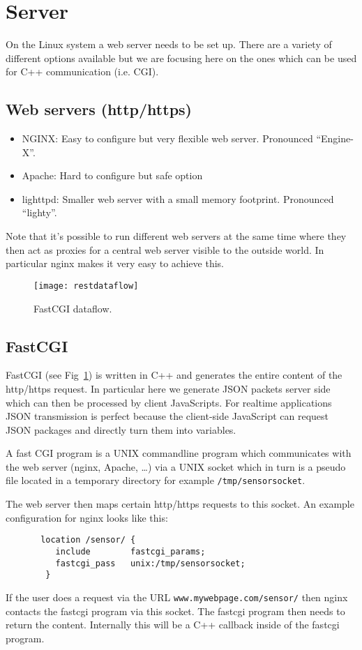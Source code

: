 \documentclass[12pt]{report}
\begin{document}
\section{Server}
On the Linux system a web server needs to be set up. There are
a variety of different options available but we are focusing here
on the ones which can be used for C++ communication (i.e. CGI).

\subsection{Web servers (http/https)}

\begin{itemize}
  \item NGINX: Easy to configure but very flexible web server. Pronounced ``Engine-X''.
  \item Apache: Hard to configure but safe option
  \item lighttpd: Smaller web server with a small memory footprint. Pronounced ``lighty''.
\end{itemize}
Note that it's possible to run different web servers at the
same time where they then act as proxies for a central web
server visible to the outside world. In particular nginx
makes it very easy to achieve this.

\begin{figure}[h]
\begin{center}
\texttt{[image: restdataflow]}
\end{center}
\caption{FastCGI dataflow.\label{cgi}}
\end{figure}

\subsection{FastCGI}
FastCGI (see Fig~\ref{cgi}) is written in C++ and generates the entire
content of the http/https request. In particular here we generate
JSON packets server side which can then be processed by client JavaScripts.
For realtime applications JSON transmission is perfect because the client-side
JavaScript can request JSON packages and directly turn them into variables.

A fast CGI program is a UNIX commandline program which communicates with the web server
(nginx, Apache, \ldots) via a UNIX socket which in turn is a pseudo file located
in a temporary directory for example \texttt{/tmp/sensorsocket}.

The web server then maps certain http/https requests to
this socket. An example configuration for nginx looks like this:
\begin{verbatim}
       location /sensor/ {
          include        fastcgi_params;
          fastcgi_pass   unix:/tmp/sensorsocket;
        }
\end{verbatim}
If the user does a request via the URL \texttt{www.mywebpage.com/sensor/} then
nginx contacts the fastcgi program via this socket. The fastcgi program
then needs to return the content. Internally this will be a C++ callback
inside of the fastcgi program.
\end{document}
